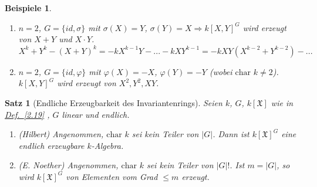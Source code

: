 \documentclass[a4paper,12pt]{scrbook}
\theoremstyle{break}
\newtheorem{Satz}{Satz}
\theoremstyle{nonumberbreak}
\newtheorem{nnBsp}{Beispiele}
\theoremstyle{nonumberplain}
\newcommand{\myref}[2]{%
\hyperref[#2]{#1~\ref*{#2}}%
}
\begin{document}
\begin{nnBsp}
  \begin{enumerate}
    \item[1.)] $n=2$, $G = \{id, \sigma\}$ mit $\sigma(X) = Y$, $\sigma(Y) = X
               \Rightarrow k[X,Y]^G$ wird erzeugt von $X+Y$ und $X \cdot Y$.\\
               $X^k+Y^k - (X + Y)^k = -kX^{k-1} Y - ... - kX Y^{k-1} = -kX Y
               (X^{k-2} + Y^{k-2}) - ...$
    \item[2.)] $n=2$, $G = \{ id, \varphi\}$ mit $\varphi(X) = -X$, $\varphi(Y) =
               -Y$ (wobei $\mbox{char }k \not= 2$).\\
               $k[X,Y]^G$ wird erzeugt von $X^2, Y^2, XY$.
  \end{enumerate}
\end{nnBsp}

\begin{Satz}[Endliche Erzeugbarkeit des Invariantenrings]
  Seien $k$, $G$, $k[\mathfrak{X}]$ wie in \myref{Def.}{2.19}, $G$ linear und endlich.
  \begin{enumerate}
    \item (Hilbert) Angenommen, $\mbox{char }k$ sei kein Teiler von $\left|G\right|$. Dann
          ist $k[\mathfrak{X}]^G$ eine endlich erzeugbare $k$-Algebra.
    \item (E. Noether) Angenommen, $\mbox{char }k$ sei kein Teiler von $\left|G\right|!$.
          Ist $m = |G|$, so wird $k[\mathfrak{X}]^G$ von Elementen vom Grad
          $\le m$ erzeugt.
  \end{enumerate}
\end{Satz}
\end{document}
